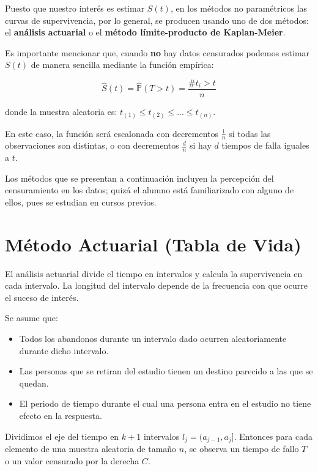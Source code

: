 \documentclass[
  a4paper,
  oneside,
  openany]{book}
\providecommand{\tightlist}{%
  \setlength{\itemsep}{0pt}\setlength{\parskip}{0pt}}
\begin{document}
Puesto que nuestro interés es estimar \(S(t)\), en los métodos no paramétricos las curvas de supervivencia, por lo general, se producen usando uno de dos métodos: el \textbf{análisis actuarial} o el \textbf{método límite-producto de Kaplan-Meier}.

Es importante mencionar que, cuando \textbf{no} hay datos censurados podemos estimar \(S(t)\) de manera sencilla mediante la función empírica:

\[
\hat S(t) = \hat{\mathbb{P}}(T>t) = \frac{ \# t_{i}>t}{n}
\]

donde la muestra aleatoria es: \(t_{(1)}\leq t_{(2)}\leq...\leq t_{(n)}\).

En este caso, la función será escalonada con decrementos \(\frac{1}{n}\) si todas las observaciones son distintas, o con decrementos \(\frac{d}{n}\) si hay \(d\) tiempos de falla iguales a \(t\).

Los métodos que se presentan a continuación incluyen la percepción del censuramiento en los datos; quizá el alumno está familiarizado con alguno de ellos, pues se estudian en cursos previos.

\hypertarget{muxe9todo-actuarial-tabla-de-vida}{%
\section{Método Actuarial (Tabla de Vida)}\label{muxe9todo-actuarial-tabla-de-vida}}

El análisis actuarial divide el tiempo en intervalos y calcula la supervivencia en cada intervalo. La longitud del intervalo depende de la frecuencia con que ocurre el suceso de interés.

Se asume que:

\begin{itemize}
\tightlist
\item
  Todos los abandonos durante un intervalo dado ocurren aleatoriamente durante dicho intervalo.
\item
  Las personas que se retiran del estudio tienen un destino parecido a las que se quedan.
\item
  El periodo de tiempo durante el cual una persona entra en el estudio no tiene efecto en la respuesta.
\end{itemize}

Dividimos el eje del tiempo en \(k+1\) intervalos \(l_{j}=(a_{j-1},a_{j}]\). Entonces para cada elemento de una muestra aleatoria de tamaño \(n\), se observa un tiempo de fallo \(T\) o un valor censurado por la derecha \(C\).
\end{document}
